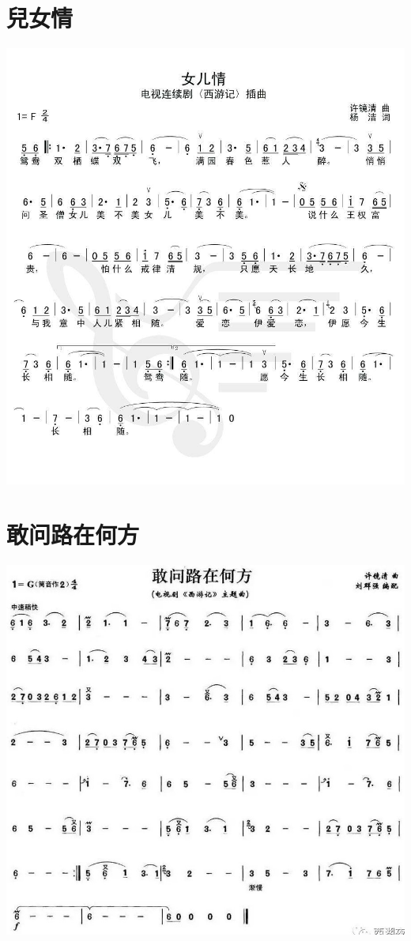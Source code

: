 \documentclass[cn,pad,twocol]{elegantbook}
\begin{document}
\section{兒女情}                \includegraphics[width=\textwidth]{dongxiao/西游记-儿女情}  
\section{敢问路在何方}          \includegraphics[width=\textwidth]{dongxiao/20200819/西游记-敢问路在何方.jpeg}
\end{document}
